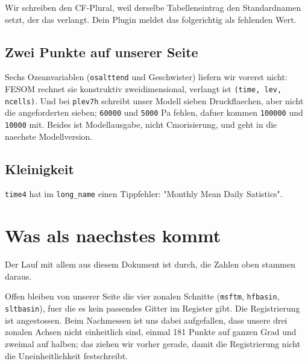 \documentclass[11pt,a4paper]{article}
\newcommand{\code}[1]{\texttt{\small #1}}
\begin{document}
Wir schreiben den CF-Plural, weil derselbe Tabelleneintrag den Standardnamen setzt,
der das verlangt. Dein Plugin meldet das folgerichtig als fehlenden Wert.

\subsection*{Zwei Punkte auf unserer Seite}

Sechs Ozeanvariablen (\code{osalttend} und Geschwister) liefern wir vorerst
nicht: FESOM rechnet sie konstruktiv zweidimensional, verlangt ist
\code{(time, lev, ncells)}. Und bei \code{plev7h} schreibt unser Modell sieben
Druckflaechen, aber nicht die angeforderten sieben; \code{60000} und \code{5000}
Pa fehlen, dafuer kommen \code{100000} und \code{10000} mit. Beides ist
Modellausgabe, nicht Cmorisierung, und geht in die naechste Modellversion.

\subsection*{Kleinigkeit}

\code{time4} hat im \code{long\_name} einen Tippfehler: "Monthly Mean Daily
Satistics".

\section{Was als naechstes kommt}

Der Lauf mit allem aus diesem Dokument ist durch, die Zahlen oben stammen
daraus.

Offen bleiben von unserer Seite die vier zonalen Schnitte
(\code{msftm}, \code{hfbasin}, \code{sltbasin}), fuer die es kein passendes Gitter im
Register gibt. Die Registrierung ist angestossen. Beim Nachmessen ist uns dabei
aufgefallen, dass unsere drei zonalen Achsen nicht einheitlich sind, einmal 181
Punkte auf ganzen Grad und zweimal auf halben; das ziehen wir vorher gerade, damit
die Registrierung nicht die Uneinheitlichkeit festschreibt.
\end{document}
